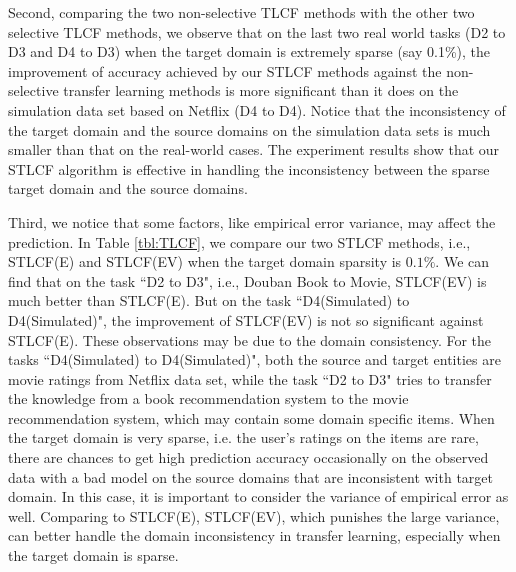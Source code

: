 Second, comparing the two non-selective TLCF methods with the other two selective TLCF methods, we observe that on the last two real world tasks (D2 to D3 and D4 to D3) when the target domain is extremely sparse (say 0.1\%), the improvement of accuracy achieved by our STLCF methods against the non-selective transfer learning methods is more significant than it does on the simulation data set based on Netflix (D4 to D4).
Notice that the inconsistency of the target domain and the source domains on the simulation data sets is much smaller than that on the real-world cases. The experiment results show that our STLCF algorithm is effective in handling the inconsistency between the sparse target domain and the source domains.

Third, we notice that some factors, like empirical error variance, may affect the prediction. In Table \ref{tbl:TLCF}, we compare our two STLCF methods, i.e., STLCF(E) and STLCF(EV) when the target domain sparsity is $0.1\%$. We can find that on the task ``D2 to D3", i.e., Douban Book to Movie, STLCF(EV) is much better than STLCF(E). But on the task ``D4(Simulated) to D4(Simulated)", the improvement of STLCF(EV) is not so significant against STLCF(E). These observations may be due to the domain consistency.
For the tasks ``D4(Simulated) to D4(Simulated)", both the source and target entities are movie ratings from Netflix data set, while the task ``D2 to D3" tries to transfer the knowledge from a book recommendation system to the movie recommendation system, which may contain some domain specific items.
When the target domain is very sparse, i.e. the user's ratings on the items are rare, there are chances to get high prediction accuracy occasionally on the observed data with a bad model on the source domains that are inconsistent with target domain. In this case, it is important to consider the variance of empirical error as well. Comparing to STLCF(E), STLCF(EV), which punishes the large variance, can better handle the domain inconsistency in transfer learning, especially when the target domain is sparse.

\hspace{0.05in}
